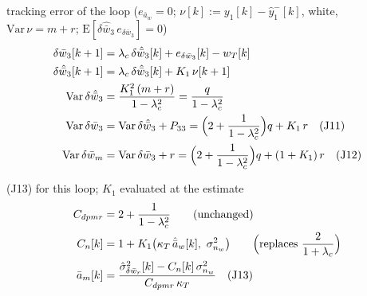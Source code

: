 \documentclass[11pt,a4paper,fontset=none]{ctexart}
\newcommand{\ba}{\bar{a}}
\newcommand{\bw}{\bar{w}}
\newcommand{\ah}{\hat{\ba}_w}
\newcommand{\lc}{\lambda_c}
\newcommand{\am}{\ba_m}
\newcommand{\J}[1]{\quad\text{(J#1)}}
\begin{document}
tracking error of the loop ($e_{\ba_w} = 0$; $\nu[k] := y_1[k] - \hat y_1^{-}[k]$, white, $\mathrm{Var}\,\nu = m + r$; $\mathrm{E}[\delta\hat{\bw}_3\,e_{\delta\bw_3}] = 0$)
\begin{align*}
\delta\bw_3[k+1]       &= \lc\,\delta\hat{\bw}_3[k] + e_{\delta\bw_3}[k] - w_T[k] \\
\delta\hat{\bw}_3[k+1] &= \lc\,\delta\hat{\bw}_3[k] + K_1\,\nu[k+1] \\
\mathrm{Var}\,\delta\hat{\bw}_3 &= \frac{K_1^{2}\,(m + r)}{1 - \lc^{2}} = \frac{q}{1 - \lc^{2}} \\
\mathrm{Var}\,\delta\bw_3 &= \mathrm{Var}\,\delta\hat{\bw}_3 + P_{33} = \Bigl(2 + \frac{1}{1 - \lc^{2}}\Bigr)q + K_1\,r \J{11} \\
\mathrm{Var}\,\delta\bw_m &= \mathrm{Var}\,\delta\bw_3 + r = \Bigl(2 + \frac{1}{1 - \lc^{2}}\Bigr)q + (1 + K_1)\,r \J{12}
\end{align*}

(J13) for this loop; $K_1$ evaluated at the estimate
\begin{align*}
C_{dpmr} &= 2 + \frac{1}{1 - \lc^{2}} \qquad(\text{unchanged}) \\
C_n[k]   &= 1 + K_1\bigl(\kappa_T\,\ah[k],\ \sigma^{2}_{n_w}\bigr) \qquad\Bigl(\text{replaces } \frac{2}{1 + \lc}\Bigr) \\
\am[k]   &= \frac{\hat\sigma^{2}_{\delta\bw_r}[k] - C_n[k]\,\sigma^{2}_{n_w}}{C_{dpmr}\,\kappa_T} \J{13}
\end{align*}
\end{document}
